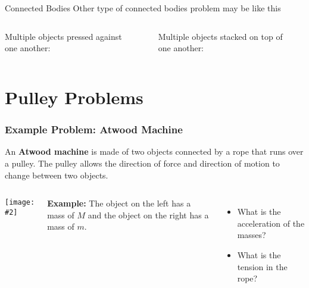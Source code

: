 \documentclass[12pt,compress,aspectratio=169]{beamer}
\newcommand{\pic}[2]{\texttt{[image: \#2]}}
\newcommand{\mb}[1]{\ensuremath\mathbf{#1}}
\begin{document}
\begin{frame}{Connected Bodies}
  Other type of connected bodies problem may be like this

  \vspace{.2in}
  \begin{columns}
    Multiple objects pressed against one another:
    \begin{center}
    \end{center}
    
    Multiple objects stacked on top of one another:
    \begin{center}
    \end{center}
  \end{columns}
\end{frame}


\section{Pulley Problems}
\begin{frame}
  \frametitle{Example Problem: Atwood Machine}
  An \textbf{Atwood machine} is made of two objects connected by a rope that
  runs over a pulley. The pulley allows the direction of force and direction
  of motion to change between two objects.
  \begin{columns}
    \begin{center}
      \pic{1}{graphics/pulley_prob_2.png}
    \end{center}
    \textbf{Example:} The object on the left has a mass of $M$ and the object
    on the right has a mass of $m$.
    \begin{itemize}
    \item What is the acceleration of the masses?
    \item What is the tension in the rope?
    \end{itemize}
  \end{columns}
\end{frame}
\end{document}
